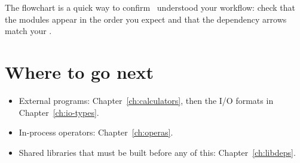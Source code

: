 \noindent The flowchart is a quick way to confirm \Jarvis\ understood your workflow: check that
the modules appear in the order you expect and that the dependency arrows match your
.

\section{Where to go next}
\label{sec:wf-next}

\begin{itemize}
  \item External programs: Chapter~\ref{ch:calculators}, then the I/O formats in
        Chapter~\ref{ch:io-types}.
  \item In-process operators: Chapter~\ref{ch:operas}.
  \item Shared libraries that must be built before any of this: Chapter~\ref{ch:libdeps}.
\end{itemize}
